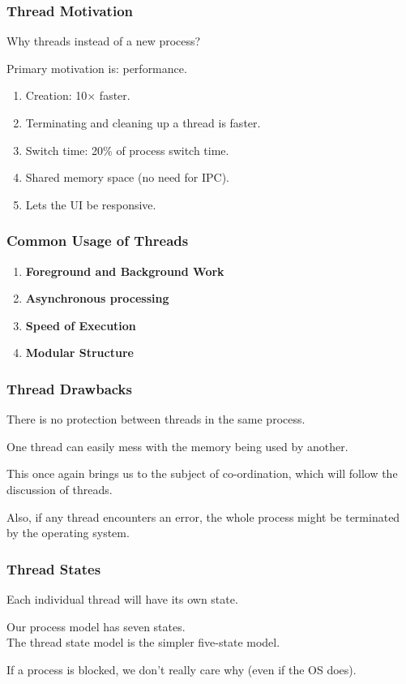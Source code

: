 \begin{frame}
	\frametitle{Thread Motivation}
	Why threads instead of a new process?

	Primary motivation is: performance.

	\begin{enumerate}
		\item Creation: 10$\times$ faster.
		\item Terminating and cleaning up a thread is faster.
		\item Switch time: 20\% of process switch time.
		\item Shared memory space (no need for IPC).
		\item Lets the UI be responsive.
	\end{enumerate}

\end{frame}

\begin{frame}
	\frametitle{Common Usage of Threads}

	\begin{enumerate}
		\item \textbf{Foreground and Background Work}
		\item \textbf{Asynchronous processing}
		\item \textbf{Speed of Execution}
		\item \textbf{Modular Structure}
	\end{enumerate}

\end{frame}

\begin{frame}
	\frametitle{Thread Drawbacks}

	There is no protection between threads in the same process.

	One thread can easily mess with the memory being used by another.

	This once again brings us to the subject of co-ordination, which will follow the discussion of threads.

	Also, if any thread encounters an error, the whole process might be terminated by the operating system.

\end{frame}

\begin{frame}
	\frametitle{Thread States}
	Each individual thread will have its own state.

	Our process model has seven states.\\
	\quad The thread state model is the simpler five-state model.

	If a process is blocked, we don't really care why (even if the OS does).
	
\end{frame}

